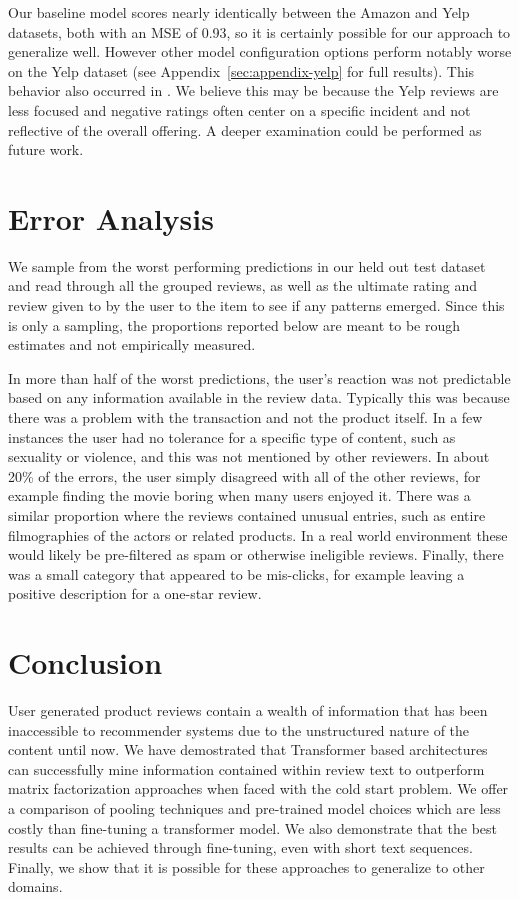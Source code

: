 \documentclass[11pt,a4paper]{article}
\begin{document}
Our baseline model scores nearly identically between the Amazon and Yelp datasets, both with an MSE of 0.93, so it is certainly possible for our approach to generalize well.  However other model configuration options perform notably worse on the Yelp dataset (see Appendix~\ref{sec:appendix-yelp} for full results). This behavior also occurred in \citet{zheng2017joint-modeling}.  We believe this may be because the Yelp reviews are less focused and negative ratings often center on a specific incident and not reflective of the overall offering. A deeper examination could be performed as future work.


\section{Error Analysis}

We sample from the worst performing predictions in our held out test dataset and read through all the grouped reviews, as well as the ultimate rating and review given to by the user to the item to see if any patterns emerged.  Since this is only a sampling, the proportions reported below are meant to be rough estimates and not empirically measured.

In more than half of the worst predictions, the user's reaction was not predictable based on any information available in the review data.  Typically this was because there was a problem with the transaction and not the product itself.  In a few instances the user had no tolerance for a specific type of content, such as sexuality or violence, and this was not mentioned by other reviewers.  In about 20\% of the errors, the user simply disagreed with all of the other reviews, for example finding the movie boring when many users enjoyed it. There was a similar proportion where the reviews contained unusual entries, such as entire filmographies of the actors or related products.  In a real world environment these would likely be pre-filtered as spam or otherwise ineligible reviews.  Finally, there was a small category that appeared to be mis-clicks, for example leaving a positive description for a one-star review. 

\section{Conclusion}

User generated product reviews contain a wealth of information that has been inaccessible to recommender systems due to the unstructured nature of the content until now.  We have demostrated that Transformer based architectures can successfully mine information contained within review text to outperform matrix factorization approaches when faced with the cold start problem.  We offer a comparison of pooling techniques and pre-trained model choices which are less costly than fine-tuning a transformer model.  We also demonstrate that the best results can be achieved through fine-tuning, even with short text sequences.  Finally, we show that it is possible for these approaches to generalize to other domains.
\end{document}
